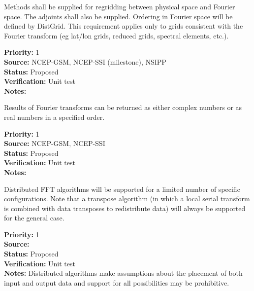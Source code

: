 
Methods shall be supplied for regridding between physical space and
Fourier space.  The adjoints shall also be supplied.  Ordering in
Fourier space will be defined by DistGrid.  This requirement applies only
to grids consistent with the Fourier transform (eg lat/lon grids,
reduced grids, spectral elements, etc.).

\begin{reqlist}
{\bf Priority:} 1 \\
{\bf Source:}  NCEP-GSM, NCEP-SSI (milestone), NSIPP \\
{\bf Status:} Proposed \\
{\bf Verification:} Unit test \\
{\bf Notes:} 
\end{reqlist}


Results of Fourier transforms can be returned as either
complex numbers or as real numbers in a specified order.

\begin{reqlist}
{\bf Priority:} 1 \\
{\bf Source:}  NCEP-GSM, NCEP-SSI \\
{\bf Status:} Proposed \\
{\bf Verification:} Unit test \\
{\bf Notes:} 
\end{reqlist}


Distributed FFT algorithms will be supported for a limited
number of specific configurations.  Note that a transpose
algorithm (in which a local serial transform is combined
with data transposes to redistribute data) will always
be supported for the general case.

\begin{reqlist}
{\bf Priority:} 1 \\
{\bf Source:}  \\
{\bf Status:} Proposed \\
{\bf Verification:} Unit test \\
{\bf Notes:} Distributed algorithms make assumptions about
             the placement of both input and output data and
             support for all possibilities may be prohibitive.
\end{reqlist}

